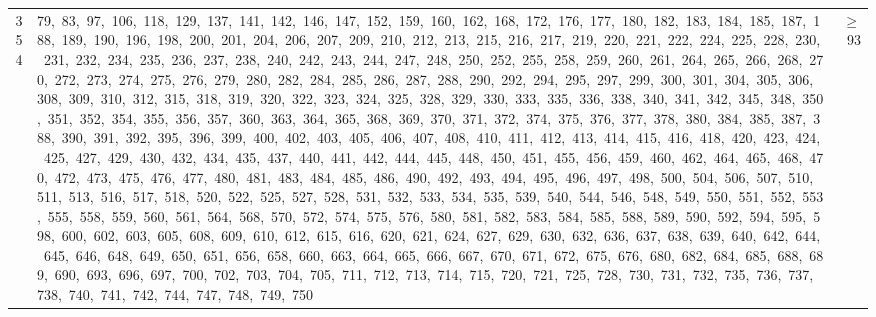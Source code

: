 \begin{longtable}{c|p{}|r}
354 & 79,\ 83,\ 97,\ 106,\ 118,\ 129,\ 137,\ 141,\ 142,\ 146,\ 147,\ 152,\ 159,\ 160,\ 162,\ 168,\ 172,\ 176,\ 177,\ 180,\ 182,\ 183,\ 184,\ 185,\ 187,\ 188,\ 189,\ 190,\ 196,\ 198,\ 200,\ 201,\ 204,\ 206,\ 207,\ 209,\ 210,\ 212,\ 213,\ 215,\ 216,\ 217,\ 219,\ 220,\ 221,\ 222,\ 224,\ 225,\ 228,\ 230,\ 231,\ 232,\ 234,\ 235,\ 236,\ 237,\ 238,\ 240,\ 242,\ 243,\ 244,\ 247,\ 248,\ 250,\ 252,\ 255,\ 258,\ 259,\ 260,\ 261,\ 264,\ 265,\ 266,\ 268,\ 270,\ 272,\ 273,\ 274,\ 275,\ 276,\ 279,\ 280,\ 282,\ 284,\ 285,\ 286,\ 287,\ 288,\ 290,\ 292,\ 294,\ 295,\ 297,\ 299,\ 300,\ 301,\ 304,\ 305,\ 306,\ 308,\ 309,\ 310,\ 312,\ 315,\ 318,\ 319,\ 320,\ 322,\ 323,\ 324,\ 325,\ 328,\ 329,\ 330,\ 333,\ 335,\ 336,\ 338,\ 340,\ 341,\ 342,\ 345,\ 348,\ 350,\ 351,\ 352,\ 354,\ 355,\ 356,\ 357,\ 360,\ 363,\ 364,\ 365,\ 368,\ 369,\ 370,\ 371,\ 372,\ 374,\ 375,\ 376,\ 377,\ 378,\ 380,\ 384,\ 385,\ 387,\ 388,\ 390,\ 391,\ 392,\ 395,\ 396,\ 399,\ 400,\ 402,\ 403,\ 405,\ 406,\ 407,\ 408,\ 410,\ 411,\ 412,\ 413,\ 414,\ 415,\ 416,\ 418,\ 420,\ 423,\ 424,\ 425,\ 427,\ 429,\ 430,\ 432,\ 434,\ 435,\ 437,\ 440,\ 441,\ 442,\ 444,\ 445,\ 448,\ 450,\ 451,\ 455,\ 456,\ 459,\ 460,\ 462,\ 464,\ 465,\ 468,\ 470,\ 472,\ 473,\ 475,\ 476,\ 477,\ 480,\ 481,\ 483,\ 484,\ 485,\ 486,\ 490,\ 492,\ 493,\ 494,\ 495,\ 496,\ 497,\ 498,\ 500,\ 504,\ 506,\ 507,\ 510,\ 511,\ 513,\ 516,\ 517,\ 518,\ 520,\ 522,\ 525,\ 527,\ 528,\ 531,\ 532,\ 533,\ 534,\ 535,\ 539,\ 540,\ 544,\ 546,\ 548,\ 549,\ 550,\ 551,\ 552,\ 553,\ 555,\ 558,\ 559,\ 560,\ 561,\ 564,\ 568,\ 570,\ 572,\ 574,\ 575,\ 576,\ 580,\ 581,\ 582,\ 583,\ 584,\ 585,\ 588,\ 589,\ 590,\ 592,\ 594,\ 595,\ 598,\ 600,\ 602,\ 603,\ 605,\ 608,\ 609,\ 610,\ 612,\ 615,\ 616,\ 620,\ 621,\ 624,\ 627,\ 629,\ 630,\ 632,\ 636,\ 637,\ 638,\ 639,\ 640,\ 642,\ 644,\ 645,\ 646,\ 648,\ 649,\ 650,\ 651,\ 656,\ 658,\ 660,\ 663,\ 664,\ 665,\ 666,\ 667,\ 670,\ 671,\ 672,\ 675,\ 676,\ 680,\ 682,\ 684,\ 685,\ 688,\ 689,\ 690,\ 693,\ 696,\ 697,\ 700,\ 702,\ 703,\ 704,\ 705,\ 711,\ 712,\ 713,\ 714,\ 715,\ 720,\ 721,\ 725,\ 728,\ 730,\ 731,\ 732,\ 735,\ 736,\ 737,\ 738,\ 740,\ 741,\ 742,\ 744,\ 747,\ 748,\ 749,\ 750 & $\ge$ 93 \\

\end{longtable}

